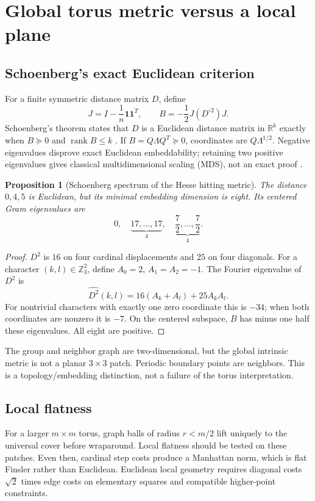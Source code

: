 \documentclass[11pt]{article}
\newtheorem{proposition}[theorem]{Proposition}
\theoremstyle{definition}
\theoremstyle{remark}
\newcommand{\rank}{\operatorname{rank}}
\newcommand{\R}{\mathbb R}
\newcommand{\Z}{\mathbb Z}
\begin{document}
\section{Global torus metric versus a local plane}

\subsection{Schoenberg's exact Euclidean criterion}

For a finite symmetric distance matrix \(D\), define
\[
J=I-\frac1n\bm1\bm1^T,\qquad
B=-\frac12J(D^{\circ2})J.
\]
Schoenberg's theorem states that \(D\) is a Euclidean distance matrix in
\(\R^k\) exactly when \(B\succeq0\) and \(\rank B\le k\)
\cite{Schoenberg1935}. If \(B=Q\Lambda Q^T\succeq0\), coordinates are
\(Q\Lambda^{1/2}\). Negative eigenvalues disprove exact Euclidean
embeddability; retaining two positive eigenvalues gives classical
multidimensional scaling (MDS), not an exact proof \cite{BorgGroenen2005}.

\begin{proposition}[Schoenberg spectrum of the Hesse hitting metric]
\label{prop:spectrum}
The distance \(0,4,5\) is Euclidean, but its minimal embedding dimension is
eight. Its centered Gram eigenvalues are
\[
0,\quad
\underbrace{17,\ldots,17}_{4},\quad
\underbrace{\frac72,\ldots,\frac72}_{4}.
\]
\end{proposition}
\begin{proof}
\(D^2\) is \(16\) on four cardinal displacements and \(25\) on four
diagonals. For a character \((k,l)\in\Z_3^2\), define
\(A_0=2\), \(A_1=A_2=-1\). The Fourier eigenvalue of \(D^2\) is
\[
\widehat{D^2}(k,l)=16(A_k+A_l)+25A_kA_l.
\]
For nontrivial characters with exactly one zero coordinate this is \(-34\);
when both coordinates are nonzero it is \(-7\). On the centered subspace,
\(B\) has minus one half these eigenvalues. All eight are positive.
\end{proof}

The group and neighbor graph are two-dimensional, but the global intrinsic
metric is not a planar \(3\times3\) patch. Periodic boundary points are
neighbors. This is a topology/embedding distinction, not a failure of the
torus interpretation.

\subsection{Local flatness}

For a larger \(m\times m\) torus, graph balls of radius \(r<m/2\) lift
uniquely to the universal cover before wraparound. Local flatness should be
tested on these patches. Even then, cardinal step costs produce a Manhattan
norm, which is flat Finsler rather than Euclidean. Euclidean local geometry
requires diagonal costs \(\sqrt2\) times edge costs on elementary squares and
compatible higher-point constraints.
\end{document}
